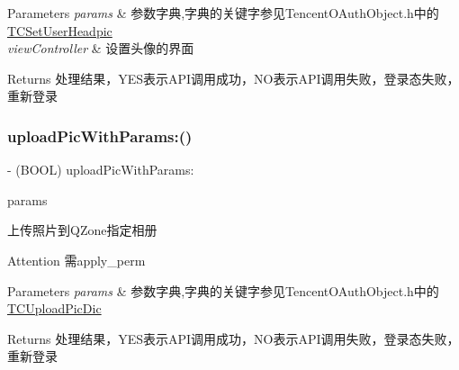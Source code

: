 \begin{DoxyParams}{Parameters}
{\em params} & 参数字典,字典的关键字参见\+Tencent\+O\+Auth\+Object.\+h中的\mbox{\hyperlink{interface_t_c_set_user_headpic}{T\+C\+Set\+User\+Headpic}} \\
\hline
{\em view\+Controller} & 设置头像的界面 \\
\hline
\end{DoxyParams}
\begin{DoxyReturn}{Returns}
处理结果，\+Y\+E\+S表示\+A\+P\+I调用成功，\+N\+O表示\+A\+P\+I调用失败，登录态失败，重新登录 
\end{DoxyReturn}
\mbox{\label{interface_tencent_o_auth_a3345d746ba1bcdf4621a0fcc0a9f4237}} 
\subsubsection{\texorpdfstring{upload\+Pic\+With\+Params\+:()}{uploadPicWithParams:()}\hspace{0.1cm}{\footnotesize\ttfamily [1/2]}}
{\footnotesize\ttfamily -\/ (B\+O\+OL) upload\+Pic\+With\+Params\+: \begin{DoxyParamCaption}\item[{(N\+S\+Mutable\+Dictionary $\ast$)}]{params }\end{DoxyParamCaption}}

上传照片到\+Q\+Zone指定相册 \begin{DoxyAttention}{Attention}
需apply\+\_\+perm 
\end{DoxyAttention}

\begin{DoxyParams}{Parameters}
{\em params} & 参数字典,字典的关键字参见\+Tencent\+O\+Auth\+Object.\+h中的\mbox{\hyperlink{interface_t_c_upload_pic_dic}{T\+C\+Upload\+Pic\+Dic}} \\
\hline
\end{DoxyParams}
\begin{DoxyReturn}{Returns}
处理结果，\+Y\+E\+S表示\+A\+P\+I调用成功，\+N\+O表示\+A\+P\+I调用失败，登录态失败，重新登录 
\end{DoxyReturn}
\mbox{\label{interface_tencent_o_auth_a3345d746ba1bcdf4621a0fcc0a9f4237}} 
